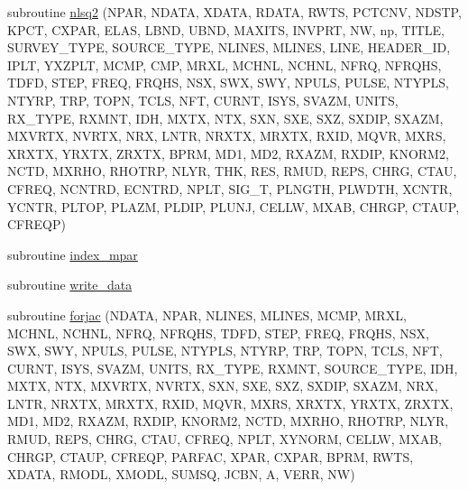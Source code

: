 \begin{DoxyCompactItemize}
subroutine \hyperlink{Leroi_8f90_a8f13594331f001917eefb525bce81f61}{nlsq2} (N\+P\+AR, N\+D\+A\+TA, X\+D\+A\+TA, R\+D\+A\+TA, R\+W\+TS, P\+C\+T\+C\+NV, N\+D\+S\+TP, K\+P\+CT, C\+X\+P\+AR, E\+L\+AS, L\+B\+ND, U\+B\+ND, M\+A\+X\+I\+TS, I\+N\+V\+P\+RT, NW, np, T\+I\+T\+LE, S\+U\+R\+V\+E\+Y\+\_\+\+T\+Y\+PE, S\+O\+U\+R\+C\+E\+\_\+\+T\+Y\+PE, N\+L\+I\+N\+ES, M\+L\+I\+N\+ES, L\+I\+NE, H\+E\+A\+D\+E\+R\+\_\+\+ID, I\+P\+LT, Y\+X\+Z\+P\+LT, M\+C\+MP, C\+MP, M\+R\+XL, M\+C\+H\+NL, N\+C\+H\+NL, N\+F\+RQ, N\+F\+R\+Q\+HS, T\+D\+FD, S\+T\+EP, F\+R\+EQ, F\+R\+Q\+HS, N\+SX, S\+WX, S\+WY, N\+P\+U\+LS, P\+U\+L\+SE, N\+T\+Y\+P\+LS, N\+T\+Y\+RP, T\+RP, T\+O\+PN, T\+C\+LS, N\+FT, C\+U\+R\+NT, I\+S\+YS, S\+V\+A\+ZM, U\+N\+I\+TS, R\+X\+\_\+\+T\+Y\+PE, R\+X\+M\+NT, I\+DH, M\+X\+TX, N\+TX, S\+XN, S\+XE, S\+XZ, S\+X\+D\+IP, S\+X\+A\+ZM, M\+X\+V\+R\+TX, N\+V\+R\+TX, N\+RX, L\+N\+TR, N\+R\+X\+TX, M\+R\+X\+TX, R\+X\+ID, M\+Q\+VR, M\+X\+RS, X\+R\+X\+TX, Y\+R\+X\+TX, Z\+R\+X\+TX, B\+P\+RM, M\+D1, M\+D2, R\+X\+A\+ZM, R\+X\+D\+IP, K\+N\+O\+R\+M2, N\+C\+TD, M\+X\+R\+HO, R\+H\+O\+T\+RP, N\+L\+YR, T\+HK, R\+ES, R\+M\+UD, R\+E\+PS, C\+H\+RG, C\+T\+AU, C\+F\+R\+EQ, N\+C\+N\+T\+RD, E\+C\+N\+T\+RD, N\+P\+LT, S\+I\+G\+\_\+T, P\+L\+N\+G\+TH, P\+L\+W\+D\+TH, X\+C\+N\+TR, Y\+C\+N\+TR, P\+L\+T\+OP, P\+L\+A\+ZM, P\+L\+D\+IP, P\+L\+U\+NJ, C\+E\+L\+LW, M\+X\+AB, C\+H\+R\+GP, C\+T\+A\+UP, C\+F\+R\+E\+QP)
\item 
subroutine \hyperlink{Leroi_8f90_a8c37d1a01918b1ce0560e8266f72f118}{index\+\_\+mpar}
\item 
subroutine \hyperlink{Leroi_8f90_a8213ad17958b78aad4a7bec6b845606b}{write\+\_\+data}
\item 
subroutine \hyperlink{Leroi_8f90_a2ce05aab7ca8a8111b718d33c0f7029c}{forjac} (N\+D\+A\+TA, N\+P\+AR, N\+L\+I\+N\+ES, M\+L\+I\+N\+ES, M\+C\+MP, M\+R\+XL, M\+C\+H\+NL, N\+C\+H\+NL, N\+F\+RQ, N\+F\+R\+Q\+HS, T\+D\+FD, S\+T\+EP, F\+R\+EQ, F\+R\+Q\+HS, N\+SX, S\+WX, S\+WY, N\+P\+U\+LS, P\+U\+L\+SE, N\+T\+Y\+P\+LS, N\+T\+Y\+RP, T\+RP, T\+O\+PN, T\+C\+LS, N\+FT, C\+U\+R\+NT, I\+S\+YS, S\+V\+A\+ZM, U\+N\+I\+TS, R\+X\+\_\+\+T\+Y\+PE, R\+X\+M\+NT, S\+O\+U\+R\+C\+E\+\_\+\+T\+Y\+PE, I\+DH, M\+X\+TX, N\+TX, M\+X\+V\+R\+TX, N\+V\+R\+TX, S\+XN, S\+XE, S\+XZ, S\+X\+D\+IP, S\+X\+A\+ZM, N\+RX, L\+N\+TR, N\+R\+X\+TX, M\+R\+X\+TX, R\+X\+ID, M\+Q\+VR, M\+X\+RS, X\+R\+X\+TX, Y\+R\+X\+TX, Z\+R\+X\+TX, M\+D1, M\+D2, R\+X\+A\+ZM, R\+X\+D\+IP, K\+N\+O\+R\+M2, N\+C\+TD, M\+X\+R\+HO, R\+H\+O\+T\+RP, N\+L\+YR, R\+M\+UD, R\+E\+PS, C\+H\+RG, C\+T\+AU, C\+F\+R\+EQ, N\+P\+LT, X\+Y\+N\+O\+RM, C\+E\+L\+LW, M\+X\+AB, C\+H\+R\+GP, C\+T\+A\+UP, C\+F\+R\+E\+QP, P\+A\+R\+F\+AC, X\+P\+AR, C\+X\+P\+AR, B\+P\+RM, R\+W\+TS, X\+D\+A\+TA, R\+M\+O\+DL, X\+M\+O\+DL, S\+U\+M\+SQ, J\+C\+BN, A, V\+E\+RR, NW)

\end{DoxyCompactItemize}
